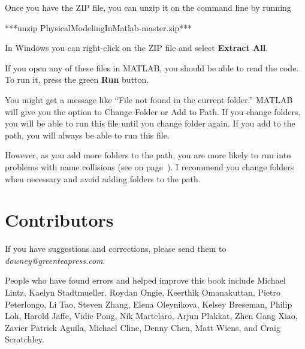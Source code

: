 Once you have the ZIP file, you can unzip it on the command line by running

\begin{code}
***unzip PhysicalModelingInMatlab-master.zip***
\end{code}

In Windows you can right-click on the ZIP file and select \textbf{Extract All}.

If you open any of these files in MATLAB, you should be able to read the code.  To run it, press the green \textbf{Run} button.

You might get a message like ``File not found in the current folder.''
MATLAB will give you the option to Change Folder or Add to Path.  If you change folders, you will be able to run this file until you change folder again.  If you add to the path, you will always be able to run this file.

However, as you add more folders to the path, you are more likely to run into problems with name collisions (see  on page~\pageref{collision}).
I recommend you change folders when necessary and avoid adding folders to the path.


\newpage

\section*{Contributors}

If you have suggestions and corrections, please send them to
\emph{downey@greenteapress.com}.

People who have found errors and helped improve this book include
Michael Lintz,
Kaelyn Stadtmueller,
Roydan Ongie,
Keerthik Omanakuttan,
Pietro Peterlongo,
Li Tao,
Steven Zhang,
Elena Oleynikova,
Kelsey Breseman,
Philip Loh,
Harold Jaffe,
Vidie Pong,
Nik Martelaro,
Arjun Plakkat,
Zhen Gang Xiao,
Zavier Patrick Aguila,
Michael Cline,
Denny Chen,
Matt Wiens,
and Craig Scratchley.

\newpage
